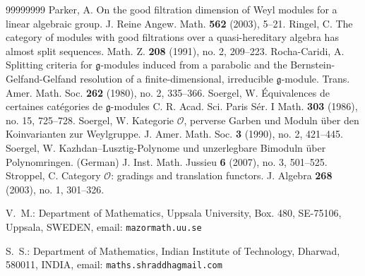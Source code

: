 \documentclass[a4paper]{amsart}
\begin{document}
\begin{thebibliography}{99999999}
Parker, A.
On the good filtration dimension of Weyl modules for a linear algebraic group.
J. Reine Angew. Math. {\bf 562} (2003), 5--21.
Ringel, C. The category of modules with good filtrations over a 
quasi-hereditary algebra has almost split sequences. 
Math. Z. {\bf 208} (1991), no. 2, 209--223.
 Rocha-Caridi, A. Splitting criteria for 
$\mathfrak{g}$-modules induced 
from a parabolic and the Bernstein-Gelfand-Gelfand 
resolution of a finite-dimensional, 
irreducible $\mathfrak{g}$-module. Trans. Amer. Math. 
Soc. {\bf 262} (1980), no. 2, 335--366.
 Soergel, W.
{\'E}quivalences de certaines cat{\'e}gories de $\mathfrak{g}$-modules
C. R. Acad. Sci. Paris S{\'e}r. I Math. {\bf 303} (1986), no. 15, 725--728.
 Soergel, W. Kategorie $\mathcal{O}$, perverse Garben und Moduln 
{\"u}ber den Koinvarianten zur Weylgruppe. 
J. Amer. Math. Soc. {\bf 3} (1990), no. 2, 421--445. 
 Soergel, W. Kazhdan--Lusztig-Polynome und unzerlegbare Bimoduln 
{\"u}ber Polynomringen. (German) J. Inst. Math. Jussieu {\bf 6} (2007), no. 3, 501--525. 
 Stroppel, C. Category $\mathcal{O}$: gradings and translation functors. 
J. Algebra {\bf 268} (2003), no. 1, 301--326. 
\end{thebibliography}


\noindent
V.~M.: Department of Mathematics, Uppsala University, Box. 480,
SE-75106, Uppsala, SWEDEN, email: {\tt mazormath.uu.se}

\noindent
S.~S.: Department of Mathematics, 
Indian Institute of Technology, Dharwad, 580011,
INDIA, email: {\tt maths.shraddhagmail.com}
\end{document}
